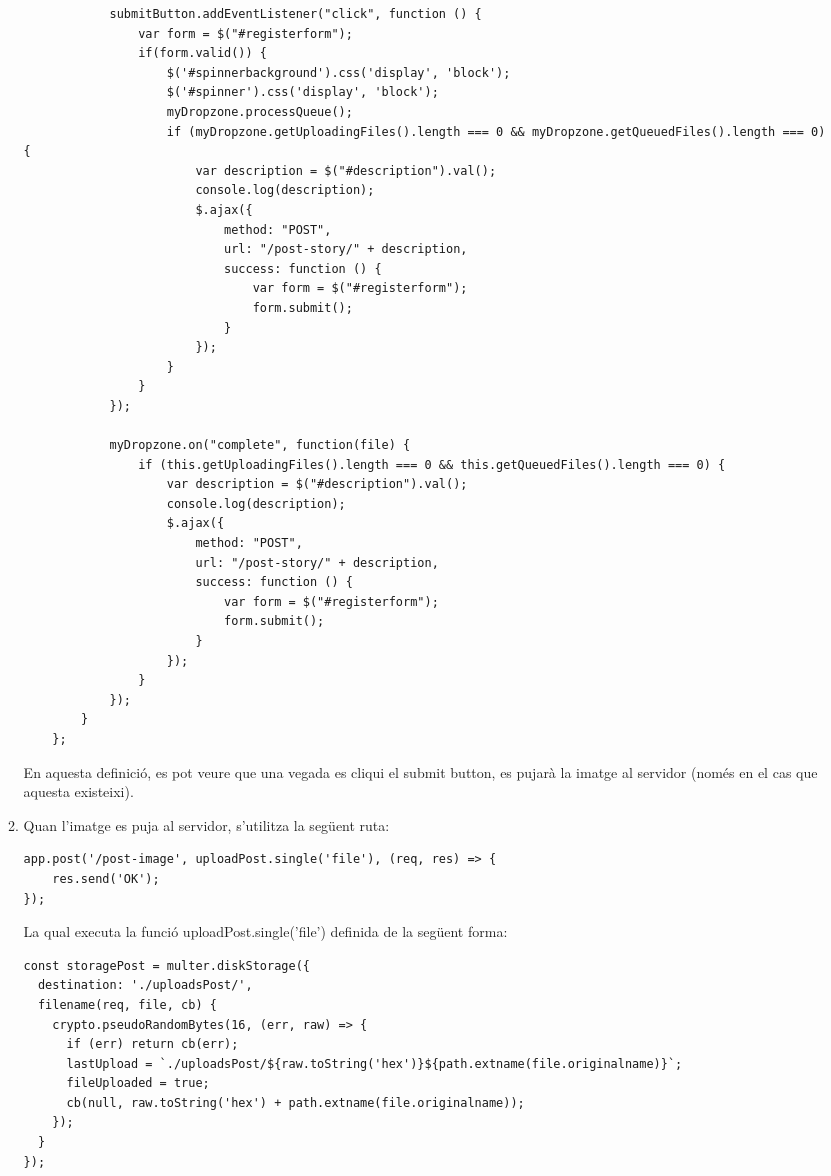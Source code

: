 \documentclass[11pt,catalan,listoffigures,listoftables]{tfgetsinf}
\begin{document}
\begin{enumerate}
\begin{enumerate}
\begin{lstlisting}
            submitButton.addEventListener("click", function () {
                var form = $("#registerform");
                if(form.valid()) {
                    $('#spinnerbackground').css('display', 'block');
                    $('#spinner').css('display', 'block');
                    myDropzone.processQueue();
                    if (myDropzone.getUploadingFiles().length === 0 && myDropzone.getQueuedFiles().length === 0) {
                        var description = $("#description").val();
                        console.log(description);
                        $.ajax({
                            method: "POST",
                            url: "/post-story/" + description,
                            success: function () {
                                var form = $("#registerform");
                                form.submit();
                            }
                        });
                    }
                }
            });

            myDropzone.on("complete", function(file) {
                if (this.getUploadingFiles().length === 0 && this.getQueuedFiles().length === 0) {
                    var description = $("#description").val();
                    console.log(description);
                    $.ajax({
                        method: "POST",
                        url: "/post-story/" + description,
                        success: function () {
                            var form = $("#registerform");
                            form.submit();
                        }
                    });
                }
            });
        }
    };
\end{lstlisting}
En aquesta definició, es pot veure que una vegada es cliqui el submit button, es pujarà la imatge al servidor (només en el cas que aquesta existeixi).
\item Quan l'imatge es puja al servidor, s'utilitza la següent ruta:
\begin{lstlisting}
app.post('/post-image', uploadPost.single('file'), (req, res) => {
    res.send('OK');
});
\end{lstlisting}
La qual executa la funció uploadPost.single('file') definida de la següent forma:
\begin{lstlisting}
const storagePost = multer.diskStorage({
  destination: './uploadsPost/',
  filename(req, file, cb) {
    crypto.pseudoRandomBytes(16, (err, raw) => {
      if (err) return cb(err);
      lastUpload = `./uploadsPost/${raw.toString('hex')}${path.extname(file.originalname)}`;
      fileUploaded = true;
      cb(null, raw.toString('hex') + path.extname(file.originalname));
    });
  }
});


\end{lstlisting}
\end{enumerate}
\end{enumerate}
\end{document}
